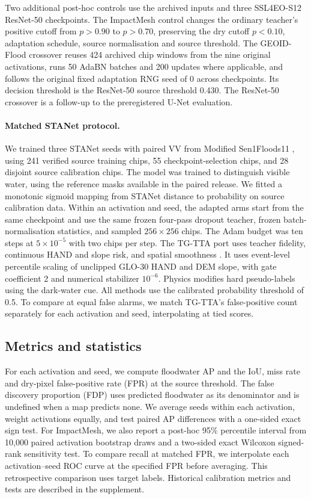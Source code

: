 \documentclass[a4paper,fleqn]{cas-sc}
\begin{document}
Two additional post-hoc controls use the archived inputs and three SSL4EO-S12 ResNet-50 checkpoints. The ImpactMesh control changes the ordinary teacher's positive cutoff from $p>0.90$ to $p>0.70$, preserving the dry cutoff $p<0.10$, adaptation schedule, source normalisation and source threshold. The GEOID-Flood crossover reuses 424 archived chip windows from the nine original activations, runs 50 AdaBN batches and 200 updates where applicable, and follows the original fixed adaptation RNG seed of 0 across checkpoints. Its decision threshold is the ResNet-50 source threshold 0.430. The ResNet-50 crossover is a follow-up to the preregistered U-Net evaluation.

\paragraph{Matched STANet protocol.} We trained three STANet seeds \citep{chen2020stanet} with paired VV from Modified Sen1Floods11 \citep{yadav2023pairedsen1floods11}, using 241 verified source training chips, 55 checkpoint-selection chips, and 28 disjoint source calibration chips. The model was trained to distinguish visible water, using the reference masks available in the paired release. We fitted a monotonic sigmoid mapping from STANet distance to probability on source calibration data. Within an activation and seed, the adapted arms start from the same checkpoint and use the same frozen four-pass dropout teacher, frozen batch-normalisation statistics, and sampled $256\times256$ chips. The Adam budget was ten steps at $5\times10^{-5}$ with two chips per step. The TG-TTA port uses teacher fidelity, continuous HAND and slope risk, and spatial smoothness \citep{song2026tgtta}. It uses event-level percentile scaling of unclipped GLO-30 HAND and DEM slope, with gate coefficient 2 and numerical stabilizer $10^{-6}$. Physics modifies hard pseudo-labels using the dark-water cue. All methods use the calibrated probability threshold of 0.5. To compare at equal false alarms, we match TG-TTA's false-positive count separately for each activation and seed, interpolating at tied scores.

\subsection{Metrics and statistics}
For each activation and seed, we compute floodwater AP and the IoU, miss rate and dry-pixel false-positive rate (FPR) at the source threshold. The false discovery proportion (FDP) uses predicted floodwater as its denominator and is undefined when a map predicts none. We average seeds within each activation, weight activations equally, and test paired AP differences with a one-sided exact sign test. For ImpactMesh, we also report a post-hoc 95\% percentile interval from 10,000 paired activation bootstrap draws and a two-sided exact Wilcoxon signed-rank sensitivity test. To compare recall at matched FPR, we interpolate each activation--seed ROC curve at the specified FPR before averaging. This retrospective comparison uses target labels. Historical calibration metrics and tests are described in the supplement.
\end{document}

